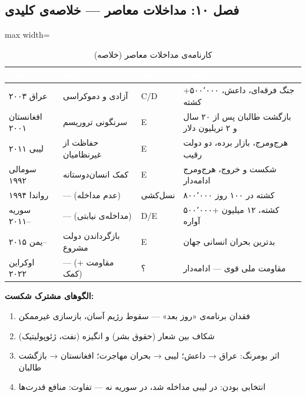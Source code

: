 \subsection{فصل ۱۰: مداخلات معاصر — خلاصه‌ی کلیدی}

\begin{table}[htbp]
\centering
\caption{کارنامه‌ی مداخلات معاصر (خلاصه)}
\label{tab:app-a-contemporary}
\begin{adjustbox}{max width=\linewidth}
\begin{tabularx}{\linewidth}{>{\raggedleft\arraybackslash}p{2.5cm} >{\raggedleft\arraybackslash}p{3cm} >{\centering\arraybackslash}p{1.5cm} >{\raggedleft\arraybackslash}X}
\toprule
\rowcolor{PrimaryDeep}
\textcolor{white}{\textbf{مورد}} & \textcolor{white}{\textbf{وعده}} & \textcolor{white}{\textbf{نتیجه}} & \textcolor{white}{\textbf{واقعیت}} \\
\midrule
عراق ۲۰۰۳ & آزادی و دموکراسی & C/D & جنگ فرقه‌ای، داعش، ۵۰۰٬۰۰۰+ کشته \\
\rowcolor{NeutralLight}
افغانستان ۲۰۰۱ & سرنگونی تروریسم & E & بازگشت طالبان پس از ۲۰ سال و ۲ تریلیون دلار \\
لیبی ۲۰۱۱ & حفاظت از غیرنظامیان & E & هرج‌ومرج، بازار برده، دو دولت رقیب \\
\rowcolor{NeutralLight}
سومالی ۱۹۹۲ & کمک انسان‌دوستانه & E & شکست و خروج، هرج‌ومرج ادامه‌دار \\
رواندا ۱۹۹۴ & — (عدم مداخله) & نسل‌کشی & ۸۰۰٬۰۰۰ کشته در ۱۰۰ روز \\
\rowcolor{NeutralLight}
سوریه ۲۰۱۱– & — (مداخله‌ی نیابتی) & D/E & ۵۰۰٬۰۰۰+ کشته، ۱۲ میلیون آواره \\
یمن ۲۰۱۵– & بازگرداندن دولت مشروع & E & بدترین بحران انسانی جهان \\
\rowcolor{NeutralLight}
اوکراین ۲۰۲۲ & — (مقاومت + کمک) & ؟ & مقاومت ملی قوی — ادامه‌دار \\
\bottomrule
\end{tabularx}
\end{adjustbox}
\end{table}

\textbf{الگوهای مشترک شکست:}
\begin{enumerate}
\item فقدان برنامه‌ی «روز بعد» — سقوط رژیم آسان، بازسازی غیرممکن
\item شکاف بین شعار (حقوق بشر) و انگیزه (نفت، ژئوپولیتیک)
\item اثر بومرنگ: عراق → داعش؛ لیبی → بحران مهاجرت؛ افغانستان → بازگشت طالبان
\item انتخابی بودن: در لیبی مداخله شد، در سوریه نه — تفاوت: منافع قدرت‌ها
\end{enumerate}


